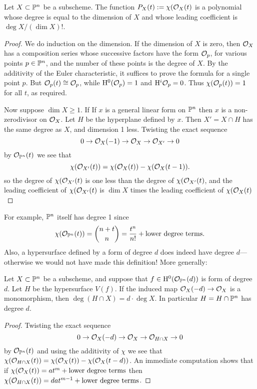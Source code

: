 \documentclass[12pt, leqno]{book}
\begin{document}
\begin{theorem}
 Let $X\subset \PP^{n}$ be a subscheme. The function
 $P_{X}(t): = \chi(\cO_{X}(t)$
 is a polynomial whose degree is equal to the dimension of $X$ and whose leading coefficient
is $\deg X/(\dim X)!$. 
\end{theorem}

\begin{proof}
 We do induction on the dimension. If the dimension of $X$ is zero, then $\cO_{X}$ has a composition series
 whose successive factors have the form $\cO_{p}$, for various points $p\in \PP^{n}$, and the number of these points
 is the degree of $X$. By the additivity of the Euler characteristic, it suffices to prove the formula for a single point $p$.
 But $\cO_{p}(t) \cong \cO_{p}$, while $\HH^{0}(\cO_{p}) = 1$ and $\HH^{i}\cO_{p} = 0$. Thus 
 $\chi(\cO_{p}(t)) = 1$ for all $t$, as required.
 
 Now suppose $\dim X\geq 1$. If
 If $x$ is a general linear form on $\PP^{n}$ then $x$ is a non-zerodivisor on 
 $\cO_{X}$. Let $H$ be the hyperplane defined by $x$. Then $X' = X\cap H$ has the same degree as $X$, and dimension
 1 less. Twisting the exact sequence
 $$
 0\to \cO_{X}(-1) \to \cO_{X} \to \cO_{X'} \to 0
 $$
 by $\cO_{\PP^{n}}(t)$ we see that 
 $$
\chi(\cO_{X'}(t)) =  \chi(\cO_{X}(t)) - \chi(\cO_{X}(t-1)).
 $$
so the degree of $\chi(\cO_{X'}(t)$ is one less than the degree of $\chi(\cO_{X'}(t)$, and the leading coefficient
of $\chi(\cO_{X'}(t)$ is $\dim X$  times the leading coefficient of $\chi(\cO_{X}(t)$
\end{proof}

For example, $\PP^{n}$ itself has degree 1 since 
$$
\chi(\cO_{\PP^{n}}(t)) = {n+t\choose n} = \frac{t^{n}}{n!} +\hbox{lower degree terms}.
$$
Also, a hypersurface defined by a form of degree $d$ does indeed have degree $d$---otherwise we would not have made
this definition! More generally:

\begin{lemma}\label{nzd Bezout}
Let $X\subset \PP^{n}$ be a subscheme, and suppose that $f \in \HH^{0}(\cO_{\PP^{n}}(d))$ is form of degree $d$. Let $H$ be the hypersurface $V(f)$.  If
the induced map $\cO_{X}(-d) \to \cO_{X}$ is a monomorphism, then 
$\deg (H \cap X) = d\cdot\deg X$. In particular $H = H\cap \PP^{n}$ has degree $d$.
\end{lemma}
\begin{proof}
Twisting the exact sequence 
 $$
 0\to \cO_{X}(-d) \to \cO_{X} \to \cO_{H\cap X} \to 0
 $$
 by $\cO_{\PP^{n}}(t)$ and using the additivity of $\chi$ we see that
$\chi(\cO_{H\cap X}(t)) = \chi(\cO_{X}(t)) - \chi(\cO_{X}(t-d))$. An immediate computation shows that if 
$\chi(\cO_{X}(t)) = at^{m} +\hbox{lower degree terms}$ then 
$\chi(\cO_{H\cap X}(t)) = dat^{m-1} +\hbox{lower degree terms}$.
\end{proof}
\end{document}
